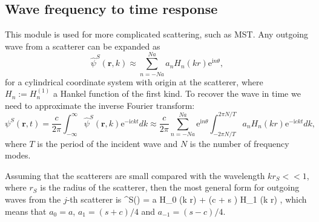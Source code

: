 \documentclass[ 12pt, a4paper]{article}
\def\bga#1\ega{\begin{gather}#1\end{gather}} %
\newcommand{\ii}{\textrm{i}}
\newcommand{\ee}{\textrm{e}}
\renewcommand{\vec}[1]{\boldsymbol{#1}}
\begin{document}
\subsection{Wave frequency to time response}

This module is used for more complicated scattering, such as MST. Any outgoing wave from a scatterer can be expanded as
\[
\hat \psi^{S}(\vec r, k) \approx \sum_{n=-Na}^{Na} a_{n} H_n (k r) \ee^{\ii n \theta},
\]
for a cylindrical coordinate system with origin at the scatterer, where $H_n:= H_n^{(1)}$ a Hankel function of the first kind. To recover the wave in time we need to approximate the inverse Fourier transform:
\[
\psi^{S}(\vec r ,t ) = \frac{c}{2 \pi}\int_{-\infty}^\infty \hat \psi^{S}(\vec r ,k ) \ee^{-\ii  c k t} d k  \approx \frac{c}{2 \pi} \sum_{n=-Na}^{Na}\ee^{\ii n \theta}  \int_{- 2 \pi N /T}^{2 \pi N /T}  a_{n} H_n (k r) \ee^{-\ii  c k t} d k,
\]
where $T$ is the period of the incident wave and $N$ is the number of frequency modes.

Assuming that the scatterers are small compared with the wavelength $k r_S << 1$, where $r_S$ is the radius of the scatterer, then the most general form for outgoing waves from the $j$-th scatterer is
\bga
\psi^{S}(\vec r) = a H_0 (k r) + (c \cos \theta + s \sin \theta ) H_1 (k r) ,
\ega
which means that $a_0 = a$, $a_1 = (s + c)/4$ and  $a_{-1} = (s-c)/4$.
\end{document}
